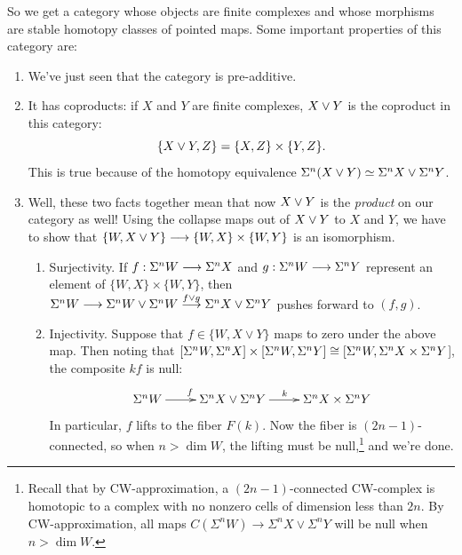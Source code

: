 So we get a category whose objects are finite complexes and whose morphisms are stable homotopy classes of pointed maps.  Some important properties of this category are:
\begin{enumerate}
\item We've just seen that the category is pre-additive.
\item It has coproducts: if $X$ and $Y$ are finite complexes, $X \vee Y$ is the coproduct in this category: \[\{X \vee Y, Z\} = \{X, Z\} \times \{Y, Z\}.\]  This is true because of the homotopy equivalence $\Sigma^n(X \vee Y) \simeq \Sigma^n X \vee \Sigma^n Y$.
\item Well, these two facts together mean that now $X \vee Y$ is the \emph{product} on our category as well!  Using the collapse maps out of $X \vee Y$ to $X$ and $Y$, we have to show that $\{W, X \vee Y\} \longrightarrow \{W, X\} \times \{W, Y\}$ is an isomorphism.
\begin{enumerate}
\item Surjectivity.  If $f: \Sigma^n W \longrightarrow \Sigma^n X$ and $g: \Sigma^n W \longrightarrow \Sigma^n Y$ represent an element of $\{W, X\} \times \{W, Y\}$, then $\Sigma^n W \longrightarrow \Sigma^n W \vee \Sigma^n W  \stackrel{f \vee g}{\longrightarrow} \Sigma^n X \vee \Sigma^n Y$ pushes forward to $(f, g)$.
\item Injectivity. Suppose that $f\in\{W,X\vee Y\}$ maps to zero under the above map. Then noting that $[\Sigma^n W, \Sigma^n X] \times [\Sigma^n W, \Sigma^n Y] \cong [\Sigma^n W, \Sigma^n X \times \Sigma^n Y$], the composite $kf$ is null:
\[\xymatrix{
\Suspend^n W\ar[r]^f&\Suspend^n X \wsum \Suspend^n Y\ar[r]^k&\Suspend^n X \times \Suspend^n Y
}\]
In particular, $f$ lifts to the fiber $F(k)$. Now the fiber is $(2n-1)$-connected, so when $n > \dim W$, the lifting must be null,\footnote{Recall that by CW-approximation, a $(2n-1)$-connected CW-complex is homotopic to a complex with no nonzero cells of dimension less than $2n$. By CW-approximation, all maps $C(\Sigma^n W)\to \Sigma^nX\vee\Sigma^n Y$ will be null when $n>\dim W$.} and we're done.
\end{enumerate}
\end{enumerate}


